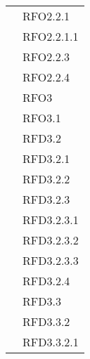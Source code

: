 \begin{longtable}{|>{\centering}m{10cm}|m{3cm}<{\centering}|}
& RFO2.2.1\\
& RFO2.2.1.1\\
& RFO2.2.3\\
& RFO2.2.4\\
& RFO3\\
& RFO3.1\\
& RFD3.2\\
& RFD3.2.1\\
& RFD3.2.2\\
& RFD3.2.3\\
& RFD3.2.3.1\\
& RFD3.2.3.2\\
& RFD3.2.3.3\\
& RFD3.2.4\\
& RFD3.3\\
& RFD3.3.2\\
& RFD3.3.2.1\\ \hline


\end{longtable}
